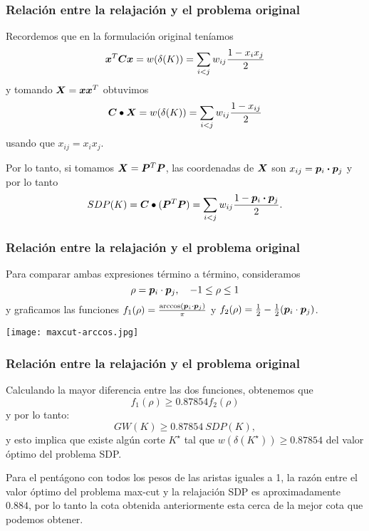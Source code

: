 \documentclass[aspectratio=169,12pt,spanish]{beamer}
\begin{document}

\begin{frame}
\frametitle{Relación entre la relajación y el problema original}

Recordemos que en la formulación original teníamos
$$
\bm{x}^T \bm{C} \bm{x} = w(\delta(K)) = \sum_{i < j}w_{ij}\frac{1-x_i x_j}{2}
$$
y tomando $\bm{X} = \bm{x} \bm{x}^T$ obtuvimos
$$
\bm{C} \bullet \bm{X} = w(\delta(K)) = \sum_{i < j}w_{ij}\frac{1-x_{ij}}{2}
$$
usando que $x_{ij} = x_i x_j$.

Por lo tanto, si tomamos $\bm{X} = \bm{P}^T \bm{P}$, las coordenadas de $\bm{X}$ son $x_{ij} = \bm{p}_i \boldsymbol{\cdot} \bm{p}_j$ y por lo tanto
$$
SDP(K) = \bm{C} \bullet (\bm{P}^T\bm{P}) = \sum_{i < j}w_{ij}\frac{1-\bm{p}_i \boldsymbol{\cdot} \bm{p}_j}{2}.
$$


\end{frame}


\begin{frame}
\frametitle{Relación entre la relajación y el problema original}

Para comparar ambas expresiones término a término, consideramos
$$\rho = \bm{p}_i \cdot \bm{p}_j, \quad -1 \le \rho \le 1$$
y graficamos las funciones $f_1(\rho) = \frac{\arccos(\bm{p}_i \cdot \bm{p}_j)}{\pi}$ y $f_2(\rho)  = \frac{1}{2} - \frac{1}{2} (\bm{p}_i \cdot \bm{p}_j)$.

\begin{center}
\texttt{[image: maxcut-arccos.jpg]}
\end{center}

\end{frame}


\begin{frame}
\frametitle{Relación entre la relajación y el problema original}



Calculando la mayor diferencia entre las dos funciones, obtenemos que
$$f_1(\rho) \ge 0.87854 f_2(\rho)$$
y por lo tanto:
$$
GW(K) \ge 0.87854 \ SDP(K),
$$
y esto implica que existe algún corte $K^\star$ tal que $w(\delta(K^\star)) \ge 0.87854$ del valor óptimo del problema SDP.

Para el pentágono con todos los pesos de las aristas iguales a 1, la razón entre el valor óptimo del problema max-cut y la relajación SDP es aproximadamente $0.884$, por lo tanto la cota obtenida anteriormente esta cerca de la mejor cota que podemos obtener.

\end{frame}

\end{document}
